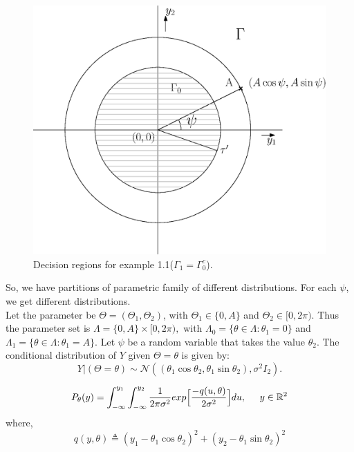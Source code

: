 \documentclass[a4paper,english,12pt]{article}
\begin{document}
\begin{exmp}
\begin{figure}
\centering
\includegraphics[scale=0.4]{Figures/decisionRegions.eps}
\caption{Decision regions for example 1.1($\Gamma_1 = \Gamma_0^c$).}
\label{fig: example 1.1}
\end{figure}

So, we have partitions of parametric family of different distributions.
For each $\psi$, we get different distributions.\\
Let the parameter be $\Theta = (\Theta_1,\Theta_2)$, with $\Theta_1 \in \{0,A\}$ and $\Theta_2 \in [0,2\pi)$. Thus the parameter set is $\Lambda = \{0,A\}\times [0,2\pi),$
with $\Lambda_0 = \{\theta \in \Lambda : \theta_1 = 0\}$ and $\Lambda_1 = \{\theta \in \Lambda : \theta_1 = A\}$. Let $\psi$ be a random variable that takes the value $\theta_2$. The conditional distribution of $Y$ given $\Theta = \theta$ is given by:\\

\begin{equation}
Y|(\Theta=\theta) \sim \mathcal{N} ((\theta_1\cos\theta_2,\theta_1\sin\theta_2), \sigma^2I_2).
\end{equation}

\begin{equation}
P_\theta(y) = \int_{-\infty}^{y_1}\int_{-\infty}^{y_2}\dfrac{1}{2\pi\sigma^2}exp\Big[\dfrac{-q(u,\theta)}{2\sigma^2}\Big]du, \hspace{0.5cm} y \in {\mathbb{R}}^2
\end{equation}
where,
\begin{equation}
q(y,\theta) \triangleq (y_1-\theta_1\cos\theta_2)^2 + (y_2-\theta_1\sin\theta_2)^2
\end{equation}


\end{exmp}
\end{document}

